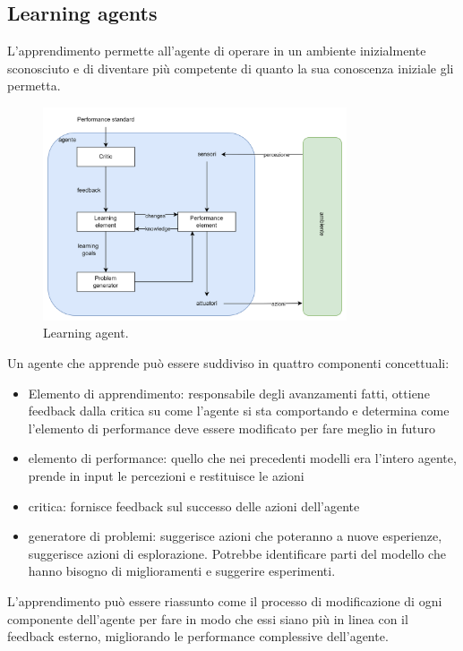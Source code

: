 \subsection{Learning agents}

L'apprendimento permette all'agente di operare in un ambiente inizialmente sconosciuto e di diventare più competente di quanto la sua conoscenza iniziale gli permetta.

\begin{figure}[H]
	\centering
	\includegraphics[width=0.8\textwidth]{capitoli/agenti-intelligenti/imgs/learning.png}
	\caption{Learning agent.}
\end{figure}

Un agente che apprende può essere suddiviso in quattro componenti concettuali:

\begin{itemize}
	\item Elemento di apprendimento: responsabile degli avanzamenti fatti, ottiene feedback dalla critica su come l'agente si sta comportando e determina come l'elemento di performance deve essere modificato per fare meglio in futuro
	\item elemento di performance: quello che nei precedenti modelli era l'intero agente, prende in input le percezioni e restituisce le azioni
	\item critica: fornisce feedback sul successo delle azioni dell'agente
	\item generatore di problemi: suggerisce azioni che poteranno a nuove esperienze, suggerisce azioni di esplorazione. Potrebbe identificare parti del modello che hanno bisogno di miglioramenti e suggerire esperimenti.
\end{itemize}

L'apprendimento può essere riassunto come il processo di modificazione di ogni componente dell'agente per fare in modo che essi siano più in linea con il feedback esterno, migliorando le performance complessive dell'agente.

